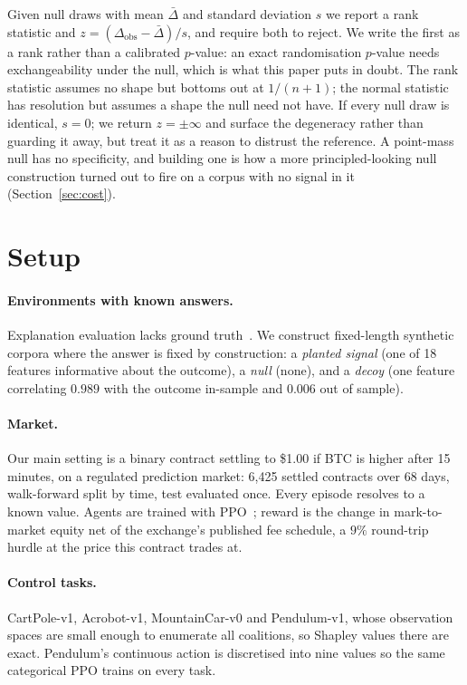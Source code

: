 \documentclass[10pt,twocolumn]{article}
\begin{document}
Given null draws with mean $\bar\Delta$ and standard deviation $s$ we report a
rank statistic and $z = (\Delta_{\mathrm{obs}} - \bar\Delta)/s$, and require both
to reject. We write the first as a rank rather than a calibrated $p$-value: an
exact randomisation $p$-value needs exchangeability under the null, which is
what this paper puts in doubt. The rank statistic assumes no shape but bottoms out at $1/(n+1)$; the
normal statistic has resolution but assumes a shape the null need not have. If
every null draw is identical, $s=0$; we return $z=\pm\infty$ and surface the
degeneracy rather than guarding it away, but treat it as a reason to distrust
the reference. A point-mass null has no specificity, and building one is how a
more principled-looking null construction turned out to fire on a corpus with no
signal in it (Section~\ref{sec:cost}).

\section{Setup}

\paragraph{Environments with known answers.} Explanation evaluation lacks ground
truth~\citep{cheng2025survey}. We construct fixed-length synthetic corpora where
the answer is fixed by construction: a \emph{planted signal} (one of 18 features
informative about the outcome), a \emph{null} (none), and a \emph{decoy} (one
feature correlating $0.989$ with the outcome in-sample and $0.006$ out of
sample).

\paragraph{Market.} Our main setting is a binary contract settling to \$1.00 if
BTC is higher after 15 minutes, on a regulated prediction market: 6{,}425 settled
contracts over 68 days, walk-forward split by time, test evaluated once. Every
episode resolves to a known value. Agents are trained with
PPO~\citep{schulman2017ppo}; reward is the change in mark-to-market equity net of
the exchange's published fee schedule, a $9\%$ round-trip hurdle at the price
this contract trades at.

\paragraph{Control tasks.} CartPole-v1, Acrobot-v1, MountainCar-v0 and
Pendulum-v1, whose observation spaces are small enough to enumerate all
coalitions, so Shapley values there are exact. Pendulum's continuous action is
discretised into nine values so the same categorical PPO trains on every task.
\end{document}
